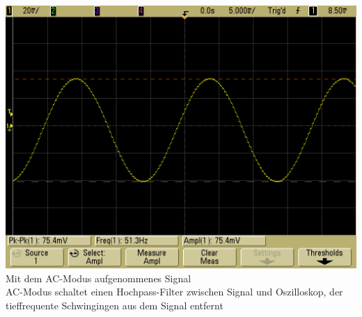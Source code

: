 \documentclass{article}
\begin{document}
\includegraphics[width=\textwidth]{../daten/scope_22}
Mit dem AC-Modus aufgenommenes Signal\\
AC-Modus schaltet einen Hochpass-Filter zwischen Signal und Oszilloskop, der tieffrequente Schwingingen aus dem Signal entfernt
\end{document}
